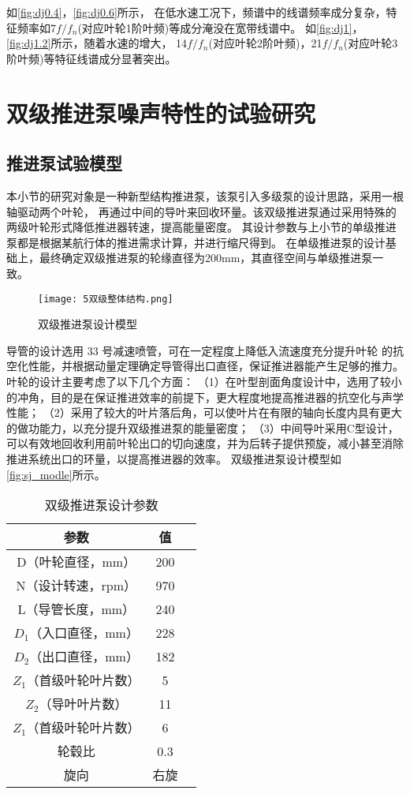 如\autoref{fig:dj0.4}，\autoref{fig:dj0.6}所示，
在低水速工况下，频谱中的线谱频率成分复杂，特征频率如7$f/f_n$(对应叶轮1阶叶频)等成分淹没在宽带线谱中。
如\autoref{fig:dj1}，\autoref{fig:dj1.2}所示，随着水速的增大，
14$f/f_n$(对应叶轮2阶叶频)，21$f/f_n$(对应叶轮3阶叶频)等特征线谱成分显著突出。
\section{双级推进泵噪声特性的试验研究}
\subsection{推进泵试验模型}
本小节的研究对象是一种新型结构推进泵，该泵引入多级泵的设计思路，采用一根轴驱动两个叶轮，
再通过中间的导叶来回收环量。该双级推进泵通过采用特殊的两级叶轮形式降低推进器转速，提高能量密度。
其设计参数与上小节的单级推进泵都是根据某航行体的推进需求计算，并进行缩尺得到。
在单级推进泵的设计基础上，最终确定双级推进泵的轮缘直径为200mm，其直径空间与单级推进泵一致。
\begin{figure}[htbp]
    \centering
    \texttt{[image: 5双级整体结构.png]}
    \caption{\label{fig:sj_modle}双级推进泵设计模型}
\end{figure}

导管的设计选用 33 号减速喷管，可在一定程度上降低入流速度充分提升叶轮
的抗空化性能，并根据动量定理确定导管得出口直径，保证推进器能产生足够的推力。
叶轮的设计主要考虑了以下几个方面：
（1）在叶型剖面角度设计中，选用了较小的冲角，目的是在保证推进效率的前提下，更大程度地提高推进器的抗空化与声学性能；
（2）采用了较大的叶片落后角，可以使叶片在有限的轴向长度内具有更大的做功能力，以充分提升双级推进泵的能量密度；
（3）中间导叶采用C型设计，可以有效地回收利用前叶轮出口的切向速度，并为后转子提供预旋，减小甚至消除推进系统出口的环量，以提高推进器的效率。
双级推进泵设计模型如\autoref{fig:sj_modle}所示。
\begin{table}[htbp]
    \centering
    \caption{\label{tab:sj}双级推进泵设计参数}
    \begin{tabular}{ccc}
     \toprule
     参数&值\\
     \midrule
     D（叶轮直径，mm）&200\\
     N（设计转速，rpm）&970\\
     L（导管长度，mm）&240\\
     $D_1$（入口直径，mm）&228\\
     $D_2$（出口直径，mm）&182\\
     $Z_1$（首级叶轮叶片数）&5\\
     $Z_2$（导叶叶片数）&11\\
     $Z_1$（首级叶轮叶片数）&6\\
     轮毂比&0.3\\
     旋向&右旋\\
     \bottomrule
    \end{tabular}
\end{table}

